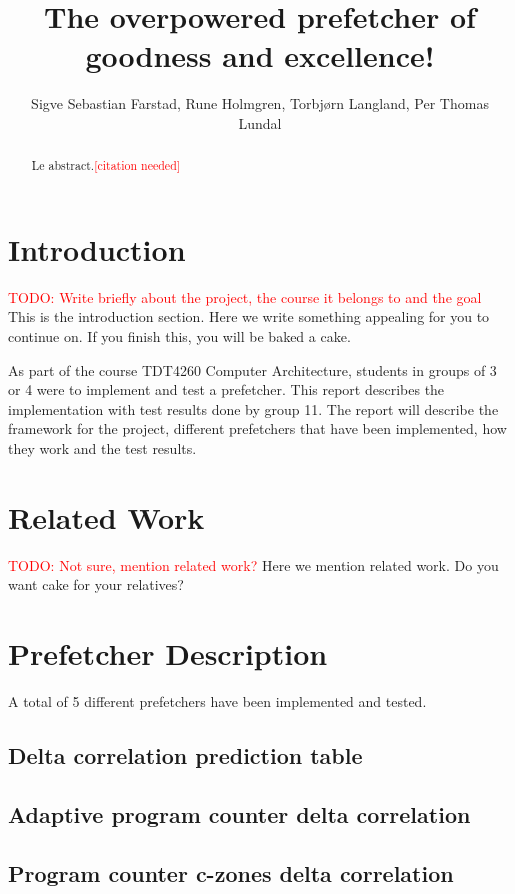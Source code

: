 \documentclass[a4paper]{IEEEtran}
\title{The overpowered prefetcher of goodness and excellence!}
\author{
    Sigve Sebastian Farstad,
    Rune Holmgren,
    Torbjørn Langland,
    Per Thomas Lundal
}
\newcommand\TODO[1]{\textcolor{red}{TODO:#1}}
\newcommand\todo[1]{\TODO{#1}}
\newcommand\cn{\textcolor{red}{[citation needed]}}
\begin{document}
\maketitle

\begin{abstract}
    Le abstract.\cn
\end{abstract}

\section{Introduction}

\todo{ Write briefly about the project, the course it belongs to and the goal}
This is the introduction section.
Here we write something appealing for you to continue on.
If you finish this, you will be baked a cake.

As part of the course TDT4260 Computer Architecture, students in groups of 3 or 4 were to implement and test a prefetcher.
This report describes the implementation with test results done by group 11.
The report will describe the framework for the project, different prefetchers that have been implemented, how they work and the test results.

\section{Related Work}

\todo{ Not sure, mention related work?}
Here we mention related work. Do you want cake for your relatives?

\section{Prefetcher Description}
A total of 5 different prefetchers have been implemented and tested. 

\subsection{Delta correlation prediction table}

\subsection{Adaptive program counter delta correlation}

\subsection{Program counter c-zones delta correlation}
\end{document}
